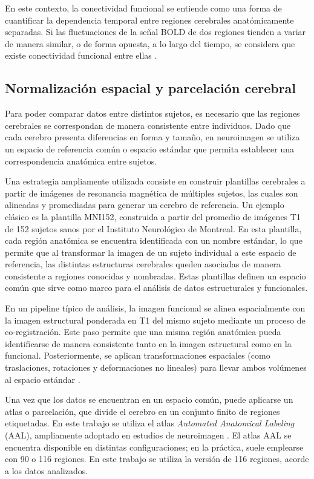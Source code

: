 En este contexto, la conectividad funcional se entiende como una forma de cuantificar la dependencia temporal entre regiones cerebrales anatómicamente separadas. Si las fluctuaciones de la señal BOLD de dos regiones tienden a variar de manera similar, o de forma opuesta, a lo largo del tiempo, se considera que existe conectividad funcional entre ellas \cite{van2010exploring}.

\subsection{Normalización espacial y parcelación cerebral}

Para poder comparar datos entre distintos sujetos, es necesario que las regiones cerebrales se correspondan de manera consistente entre individuos. Dado que cada cerebro presenta diferencias en forma y tamaño, en neuroimagen se utiliza un espacio de referencia común o espacio estándar que permita establecer una correspondencia anatómica entre sujetos.

Una estrategia ampliamente utilizada consiste en construir plantillas cerebrales a partir de imágenes de resonancia magnética de múltiples sujetos, las cuales son alineadas y promediadas para generar un cerebro de referencia. Un ejemplo clásico es la plantilla MNI152, construida a partir del promedio de imágenes T1 de 152 sujetos sanos por el Instituto Neurológico de Montreal. En esta plantilla, cada región anatómica se encuentra identificada con un nombre estándar, lo que permite que al transformar la imagen de un sujeto individual a este espacio de referencia, las distintas estructuras cerebrales queden asociadas de manera consistente a regiones conocidas y nombradas. Estas plantillas definen un espacio común que sirve como marco para el análisis de datos estructurales y funcionales.

En un pipeline típico de análisis, la imagen funcional se alinea espacialmente con la imagen estructural ponderada en T1 del mismo sujeto mediante un proceso de co-registración. Este paso permite que una misma región anatómica pueda identificarse de manera consistente tanto en la imagen estructural como en la funcional. Posteriormente, se aplican transformaciones espaciales (como traslaciones, rotaciones y deformaciones no lineales) para llevar ambos volúmenes al espacio estándar \cite{mandal2012structural}.

Una vez que los datos se encuentran en un espacio común, puede aplicarse un atlas o parcelación, que divide el cerebro en un conjunto finito de regiones etiquetadas. En este trabajo se utiliza el atlas \textit{Automated Anatomical Labeling} (AAL), ampliamente adoptado en estudios de neuroimagen \cite{tzourio2002automated}. El atlas AAL se encuentra disponible en distintas configuraciones; en la práctica, suele emplearse con 90 o 116 regiones. En este trabajo se utiliza la versión de 116 regiones, acorde a los datos analizados.

